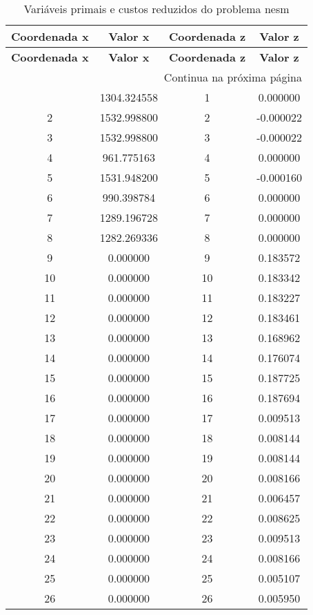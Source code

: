 \documentclass[12pt]{article}
\begin{document}
\begin{longtable}{@{}cccc@{}}
\caption{Variáveis primais e custos reduzidos do problema nesm} \\
\toprule
\textbf{Coordenada x} & \textbf{Valor x} & \textbf{Coordenada z} & \textbf{Valor z} \\
\midrule
\endfirsthead

\toprule
\textbf{Coordenada x} & \textbf{Valor x} & \textbf{Coordenada z} & \textbf{Valor z} \\
\midrule
\endhead

\midrule \multicolumn{4}{r}{{Continua na próxima página}} \\ \midrule
\endfoot

\bottomrule
\endlastfoot
1 & 1304.324558 & 1 & 0.000000 \\
2 & 1532.998800 & 2 & -0.000022 \\
3 & 1532.998800 & 3 & -0.000022 \\
4 & 961.775163 & 4 & 0.000000 \\
5 & 1531.948200 & 5 & -0.000160 \\
6 & 990.398784 & 6 & 0.000000 \\
7 & 1289.196728 & 7 & 0.000000 \\
8 & 1282.269336 & 8 & 0.000000 \\
9 & 0.000000 & 9 & 0.183572 \\
10 & 0.000000 & 10 & 0.183342 \\
11 & 0.000000 & 11 & 0.183227 \\
12 & 0.000000 & 12 & 0.183461 \\
13 & 0.000000 & 13 & 0.168962 \\
14 & 0.000000 & 14 & 0.176074 \\
15 & 0.000000 & 15 & 0.187725 \\
16 & 0.000000 & 16 & 0.187694 \\
17 & 0.000000 & 17 & 0.009513 \\
18 & 0.000000 & 18 & 0.008144 \\
19 & 0.000000 & 19 & 0.008144 \\
20 & 0.000000 & 20 & 0.008166 \\
21 & 0.000000 & 21 & 0.006457 \\
22 & 0.000000 & 22 & 0.008625 \\
23 & 0.000000 & 23 & 0.009513 \\
24 & 0.000000 & 24 & 0.008166 \\
25 & 0.000000 & 25 & 0.005107 \\
26 & 0.000000 & 26 & 0.005950 \\

\end{longtable}
\end{document}
